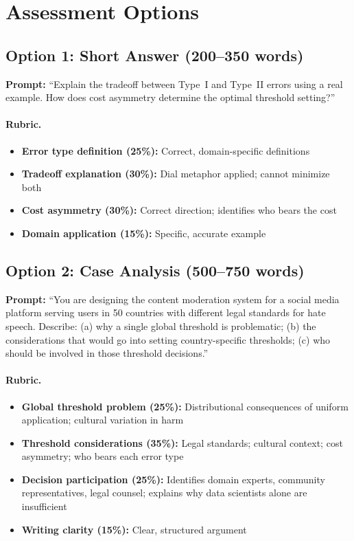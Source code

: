 \section{Assessment Options}

\subsection{Option 1: Short Answer (200--350 words)}

\textbf{Prompt:} ``Explain the tradeoff between Type~I and Type~II errors using a real example. How does cost asymmetry determine the optimal threshold setting?''

\paragraph{Rubric.}
\begin{itemize}
    \item \textbf{Error type definition (25\%):} Correct, domain-specific definitions
    \item \textbf{Tradeoff explanation (30\%):} Dial metaphor applied; cannot minimize both
    \item \textbf{Cost asymmetry (30\%):} Correct direction; identifies who bears the cost
    \item \textbf{Domain application (15\%):} Specific, accurate example
\end{itemize}

\subsection{Option 2: Case Analysis (500--750 words)}

\textbf{Prompt:} ``You are designing the content moderation system for a social media platform serving users in 50 countries with different legal standards for hate speech. Describe: (a) why a single global threshold is problematic; (b) the considerations that would go into setting country-specific thresholds; (c) who should be involved in those threshold decisions.''

\paragraph{Rubric.}
\begin{itemize}
    \item \textbf{Global threshold problem (25\%):} Distributional consequences of uniform application; cultural variation in harm
    \item \textbf{Threshold considerations (35\%):} Legal standards; cultural context; cost asymmetry; who bears each error type
    \item \textbf{Decision participation (25\%):} Identifies domain experts, community representatives, legal counsel; explains why data scientists alone are insufficient
    \item \textbf{Writing clarity (15\%):} Clear, structured argument
\end{itemize}

